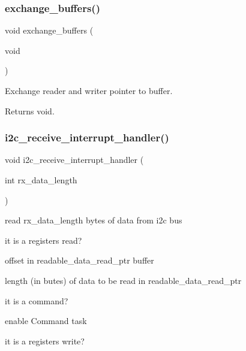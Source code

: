 \subsubsection{\texorpdfstring{exchange\+\_\+buffers()}{exchange\_buffers()}}
{\footnotesize\ttfamily void exchange\+\_\+buffers (\begin{DoxyParamCaption}\item[{void}]{ }\end{DoxyParamCaption})}



Exchange reader and writer pointer to buffer. 

\begin{DoxyReturn}{Returns}
void. 
\end{DoxyReturn}
\mbox{\label{i2c-th_8ino_a6e27532df66f6bf186654355def5c9af}} 
\subsubsection{\texorpdfstring{i2c\+\_\+receive\+\_\+interrupt\+\_\+handler()}{i2c\_receive\_interrupt\_handler()}}
{\footnotesize\ttfamily void i2c\+\_\+receive\+\_\+interrupt\+\_\+handler (\begin{DoxyParamCaption}\item[{int}]{rx\+\_\+data\+\_\+length }\end{DoxyParamCaption})}

read rx\+\_\+data\+\_\+length bytes of data from i2c bus

it is a registers read?

offset in readable\+\_\+data\+\_\+read\+\_\+ptr buffer

length (in butes) of data to be read in readable\+\_\+data\+\_\+read\+\_\+ptr

it is a command?

enable Command task

it is a registers write? \mbox{\label{i2c-th_8ino_ac816bd8aafe77e7a571574c8a26eead5}} 
